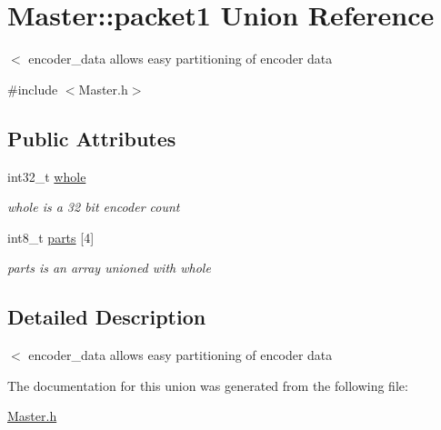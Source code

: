 \hypertarget{union_master_1_1packet1}{\section{Master\-:\-:packet1 Union Reference}
\label{union_master_1_1packet1}
}


$<$ encoder\-\_\-data allows easy partitioning of encoder data  




{\ttfamily \#include $<$Master.\-h$>$}

\subsection*{Public Attributes}
\begin{DoxyCompactItemize}
\item 
\hypertarget{union_master_1_1packet1_a97cea3aeb07a0b3fc8e061f845d311a9}{int32\-\_\-t \hyperlink{union_master_1_1packet1_a97cea3aeb07a0b3fc8e061f845d311a9}{whole}}\label{union_master_1_1packet1_a97cea3aeb07a0b3fc8e061f845d311a9}

\begin{DoxyCompactList}\small\item\em whole is a 32 bit encoder count \end{DoxyCompactList}\item 
\hypertarget{union_master_1_1packet1_aa6114b427893df62cdfdee4ef6b8e971}{int8\-\_\-t \hyperlink{union_master_1_1packet1_aa6114b427893df62cdfdee4ef6b8e971}{parts} \mbox{[}4\mbox{]}}\label{union_master_1_1packet1_aa6114b427893df62cdfdee4ef6b8e971}

\begin{DoxyCompactList}\small\item\em parts is an array unioned with whole \end{DoxyCompactList}\end{DoxyCompactItemize}


\subsection{Detailed Description}
$<$ encoder\-\_\-data allows easy partitioning of encoder data 

The documentation for this union was generated from the following file\-:\begin{DoxyCompactItemize}
\item 
\hyperlink{_master_8h}{Master.\-h}\end{DoxyCompactItemize}
